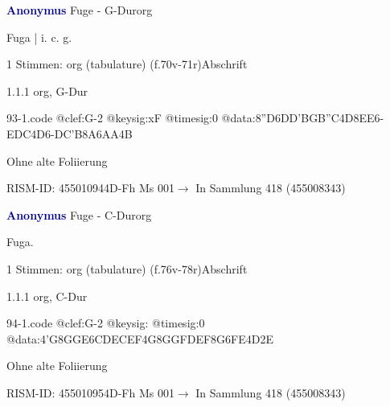 \documentclass[twocolumn]{book}
\begin{document}
\par \vspace{7pt} \textcolor{darkblue}{\textbf{Anonymus  }}\hfillplus{\textbf{[93]}}\newline Fuge - G-Dur\newline org
\par \begin{itshape}[f.70v, at left:] Fuga | i. c. g.\end{itshape} 
\par \textcolor{darkblue}{}  1 Stimmen: org (tabulature)  (f.70v-71r)\newline Abschrift
\par 1.1.1  org, G-Dur  
\begin{filecontents*}{93-1.code}
@clef:G-2
@keysig:xF
@timesig:0
@data:{8''D6DD}{'BGB''C}4D{8EE}6-{EDC}4D6-{DC'B}{8A6AA}4B
\end{filecontents*}
\newline
%
\par Ohne alte Foliierung
\par RISM-ID: 455010944\newline D-Fh  Ms 001\newline $\rightarrow$ In Sammlung 418 (455008343)
      
\par \vspace{7pt} \textcolor{darkblue}{\textbf{Anonymus  }}\hfillplus{\textbf{[94]}}\newline Fuge - C-Dur\newline org
\par \begin{itshape}[f.76v, at left:] Fuga.\end{itshape} 
\par \textcolor{darkblue}{}  1 Stimmen: org (tabulature)  (f.76v-78r)\newline Abschrift
\par 1.1.1  org, C-Dur  
\begin{filecontents*}{94-1.code}
@clef:G-2
@keysig:
@timesig:0
@data:4'G{8GG}{E6CD}{ECEF}4G{8GG}{FDEF}{8G6FE}4D2E
\end{filecontents*}
\newline
%
\par Ohne alte Foliierung
\par RISM-ID: 455010954\newline D-Fh  Ms 001\newline $\rightarrow$ In Sammlung 418 (455008343)
      
\end{document}
